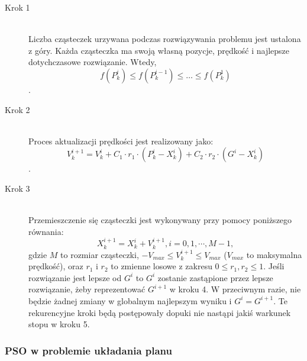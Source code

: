\begin{description}
  \item[Krok 1] \hfill \\
Liczba cząsteczek urzywana podczas rozwiązywania problemu jest ustalona z góry. Każda cząsteczka ma swoją własną pozycje, prędkość i najlepsze dotychczasowe rozwiązanie. Wtedy,
  \[f(P^{i}_{k}) \le f(P^{i-1}_{k}) \le \ldots \le f(P^{1}_{k})\].

  \item[Krok 2] \hfill \\
Proces aktualizacji prędkości jest realizowany jako:
\[V^{i+1}_{k} = V^{i}_{k} + C_{1} \cdot r_{1} \cdot (P^{i}_{k} - X^{i}_{k}) + C_{2} \cdot r_{2} \cdot (G^{i} - X^{i}_{k})\].
  \item[Krok 3] \hfill \\
Przemieszczenie się cząsteczki jest wykonywany przy pomocy poniższego równania:
\[X^{i+1}_{k} = X^{i}_{k} + V^{i+1}_{k}, i = 0,1,\cdots, M-1,\]
gdzie $M$ to rozmiar cząsteczki, $-V_{max} \le V^{i+1}_{k} \le V_{max}$ ($V_{max}$ to maksymalna prędkość), oraz $r_{1}$ i $r_{2}$ to zmienne losowe z zakresu $0 \le r_{1},r_{2} \le 1$. Jeśli rozwiązanie jest lepsze od $G^{i}$ to $G^{i}$ zostanie zastąpione przez lepsze rozwiązanie, żeby reprezentować $G^{i+1}$ w kroku 4. W przeciwnym razie, nie będzie żadnej zmiany w globalnym najlepszym wyniku i $G^{i} = G^{i+1}$. Te rekurencyjne kroki będą postępowały dopuki nie nastąpi jakiś warkunek stopu w kroku 5.  
\end{description}

\subsubsection{PSO w problemie układania planu}

